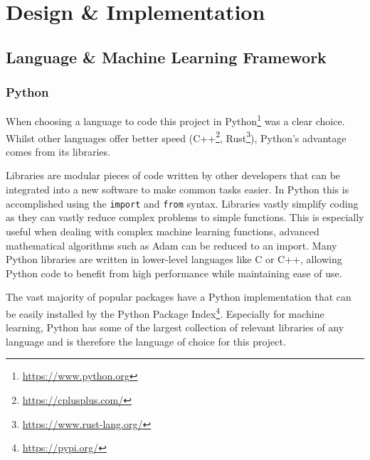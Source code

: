 \chapter{Design \& Implementation}
\label{ch:design-implementation}

\section{Language \& Machine Learning Framework}


\subsection{Python}

When choosing a language to code this project in Python\footnote{\url{https://www.python.org}} was a clear choice. Whilst other languages offer better speed (C++\footnote{\url{https://cplusplus.com/}}, Rust\footnote{\url{https://www.rust-lang.org/}}), Python's advantage comes from its libraries.

Libraries are modular pieces of code written by other developers that can be integrated into a new software to make common tasks easier. In Python this is accomplished using the \verb|import| and \verb|from| syntax. Libraries vastly simplify coding as they can vastly reduce complex problems to simple functions. This is especially useful when dealing with complex machine learning functions, advanced mathematical algorithms such as Adam can be reduced to an import. Many Python libraries are written in lower-level languages like C or C++, allowing Python code to benefit from high performance while maintaining ease of use.

The vast majority of popular packages have a Python implementation that can be easily installed by the Python Package Index\footnote{\url{https://pypi.org/}}. Especially for machine learning, Python has some of the largest collection of relevant libraries of any language and is therefore the language of choice for this project.

